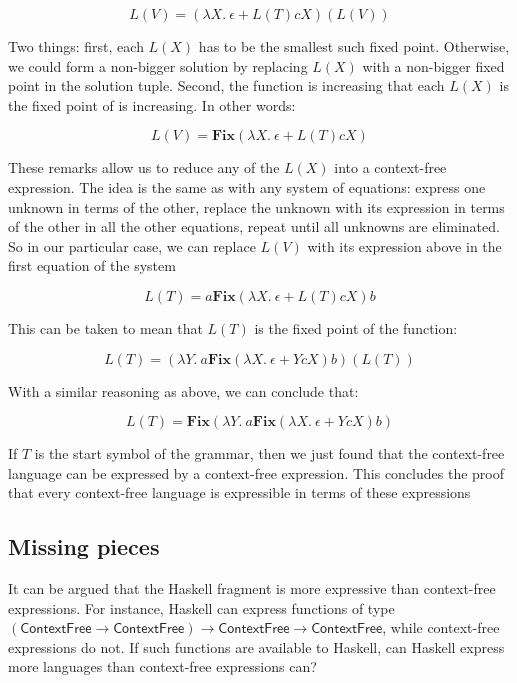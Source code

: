 $$L(V) = \left( 	\lambda X.\ \epsilon + L(T)cX\right)\left( L(V)\right)$$

Two things: first, each $L(X)$ has to be the smallest such fixed point. Otherwise, we could form a non-bigger solution by replacing $L(X)$ with a non-bigger fixed point in the solution tuple. Second, the function is increasing that each $L(X)$ is the fixed point of is increasing. In other words:

$$L(V) = \mathbf{Fix}\left( \lambda X.\ \epsilon + L(T)cX\right)$$

These remarks allow us to reduce any of the $L(X)$ into a context-free expression. The idea is the same as with any system of equations: express one unknown in terms of the other, replace the unknown with its expression in terms of the other in all the other equations, repeat until all unknowns are eliminated. So in our particular case, we can replace $L(V)$ with its expression above in the first equation of the system

$$L(T) = a\mathbf{Fix}\left( \lambda X.\ \epsilon + L(T)cX\right)b$$

This can be taken to mean that $L(T)$ is the fixed point of the function:

$$L(T) = \left(\lambda Y.\ a\mathbf{Fix}\left( \lambda X.\ \epsilon + YcX\right)b\right)\left(L(T)\right)$$

With a similar reasoning as above, we can conclude that:

$$L(T) = \mathbf{Fix}\left(\lambda Y.\ a\mathbf{Fix}\left( \lambda X.\ \epsilon + YcX\right)b\right)$$

If $T$ is the start symbol of the grammar, then we just found that the context-free language can be expressed by a context-free expression. This concludes the proof that every context-free language is expressible in terms of these expressions


\subsection{Missing pieces}

It can be argued that the Haskell fragment is more expressive than context-free expressions. For instance, Haskell can express functions of type $(\textsf{ContextFree}\rightarrow \textsf{ContextFree})\rightarrow  \textsf{ContextFree}\rightarrow \textsf{ContextFree}$, while context-free expressions do not. If such functions are available to Haskell, can Haskell express more languages than context-free expressions can? 


